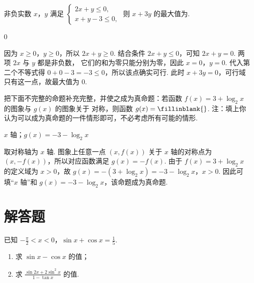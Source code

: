 \begin{problem}
非负实数 \(x\)，\(y\) 满足 \(\begin{cases}
2x + y \leqslant 0,\\
x + y - 3 \leqslant 0,
\end{cases}\) 则 \(x + 3y\) 的最大值为\fillinblank{}.

\end{problem}

\begin{answer}
0
\end{answer}

\begin{solution}
因为 \(x\geqslant0\)，\(y\geqslant0\)，所以 \(2x+y\geqslant0\). 结合条件
\(2x+y\leqslant0\)，可知 \(2x+y=0\). 两项 \(2x\) 与 \(y\) 都是非负数，
它们的和为零只能分别为零，因此 \(x=0\)，\(y=0\). 代入第二个不等式得
\(0+0-3=-3\leqslant0\)，所以该点确实可行. 此时
\(x+3y=0\)，可行域只有这一点，故最大值为 \(0\).
\end{solution}

\begin{problem}
把下面不完整的命题补充完整，并使之成为真命题：若函数 \( f(x)=3+\log_{2}x \) 的图象与 \( g(x) \) 的图象关于\fillinblank{} 对称，则函数 \( g(x)=\fillinblank{} \). 注：填上你认为可以成为真命题的一件情形即可，不必考虑所有可能的情形.
\end{problem}

\begin{answer}
\(x\) 轴；\(g(x)=-3-\log_{2}x\)
\end{answer}

\begin{solution}
取对称轴为 \(x\) 轴. 图象上任意一点 \((x,f(x))\) 关于 \(x\) 轴的对称点为
\((x,-f(x))\)，所以对应函数满足 \(g(x)=-f(x)\). 由于
\(f(x)=3+\log_{2}x\) 的定义域为 \(x>0\)，故
\(g(x)=-(3+\log_{2}x)=-3-\log_{2}x\)，\(x>0\).
因此可填“\(x\) 轴”和 \(g(x)=-3-\log_{2}x\)，该命题成为真命题.
\end{solution}

\section{解答题}

\begin{problem}
已知 \(-\frac{\pi}{2} < x < 0\)，\(\sin x + \cos x = \frac{1}{5}\).

\begin{enumerate}
\item 求 \( \sin x - \cos x \) 的值；
\item 求 \( \frac{\sin 2x + 2\sin^{2}x}{1 - \tan x} \) 的值.
\end{enumerate}

\end{problem}


